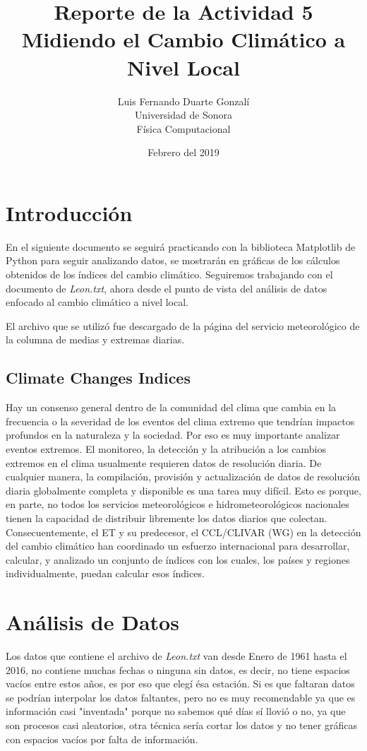 \documentclass{article}
\title{\textbf{Reporte de la Actividad 5}\\ Midiendo el Cambio Climático a Nivel Local}
\author{Luis Fernando Duarte Gonzalí \\ Universidad de Sonora \\ Física Computacional}
\date{Febrero del 2019}
\begin{document}
\maketitle


\section{Introducción}
\noindent En el siguiente documento se seguirá practicando con la biblioteca Matplotlib de Python para seguir analizando datos, se mostrarán en gráficas de los cálculos obtenidos de los índices del cambio climático. Seguiremos trabajando con el documento de \textit{Leon.txt}, ahora desde el punto de vista del análisis de datos enfocado al cambio climático a nivel local.

El archivo que se utilizó fue descargado de la página del servicio meteorológico de la columna de medias y extremas diarias.

\subsection{Climate Changes Indices}
\noindent Hay un consenso general dentro de la comunidad del clima que cambia en la frecuencia o la severidad de los eventos del clima extremo que tendrían impactos profundos en la naturaleza y la sociedad. Por eso es muy importante analizar eventos extremos. El monitoreo, la detección y la atribución a los cambios extremos en el clima usualmente requieren datos de resolución diaria. De cualquier manera, la compilación, provisión y actualización de datos de resolución diaria globalmente completa y disponible es una tarea muy difícil. Esto es porque, en parte, no todos los servicios meteorológicos e hidrometeorológicos nacionales tienen la capacidad de distribuir libremente los datos diarios que colectan. Consecuentemente, el ET y su predecesor, el CCL/CLIVAR (WG) en la detección del cambio climático han coordinado un esfuerzo internacional para desarrollar, calcular, y analizado un conjunto de índices con los cuales, los países y regiones individualmente, puedan calcular esos índices.

\section{Análisis de Datos}
Los datos que contiene el archivo de \textit{Leon.txt} van desde Enero de 1961 hasta el 2016, no contiene muchas fechas o ninguna sin datos, es decir, no tiene espacios vacíos entre estos años, es por eso que elegí ésa estación. Si es que faltaran datos se podrían interpolar los datos faltantes, pero no es muy recomendable ya que es información casi "inventada" porque no sabemos qué días sí llovió o no, ya que son procesos casi aleatorios, otra técnica sería cortar los datos y no tener gráficas con espacios vacíos por falta de información.
\end{document}
